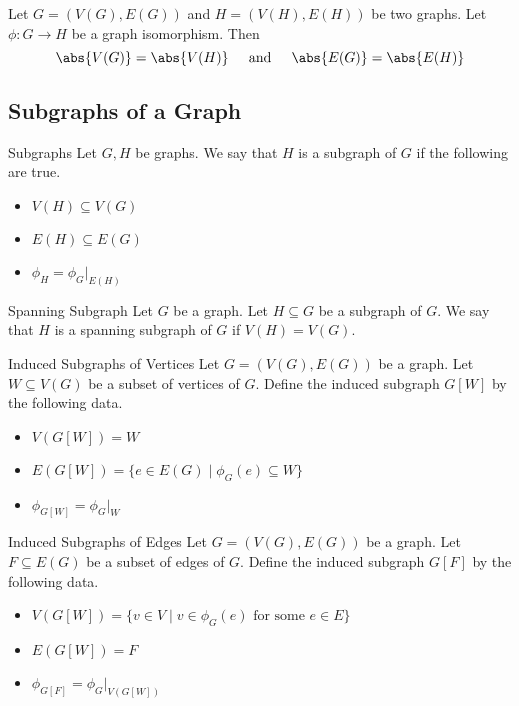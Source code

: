\documentclass[a4paper]{article}
\begin{document}
\begin{lmm}{}{} Let $G=(V(G),E(G))$ and $H=(V(H),E(H))$ be two graphs. Let $\phi:G\to H$ be a graph isomorphism. Then $$\abs{V(G)}=\abs{V(H)}\;\;\;\;\text{ and }\;\;\;\;\abs{E(G)}=\abs{E(H)}$$
\end{lmm}

\subsection{Subgraphs of a Graph}
\begin{defn}{Subgraphs}{} Let $G,H$ be graphs. We say that $H$ is a subgraph of $G$ if the following are true. 
\begin{itemize}
\item $V(H)\subseteq V(G)$
\item $E(H)\subseteq E(G)$
\item $\phi_H=\phi_G|_{E(H)}$
\end{itemize}
\end{defn}

\begin{defn}{Spanning Subgraph}{} Let $G$ be a graph. Let $H\subseteq G$ be a subgraph of $G$. We say that $H$ is a spanning subgraph of $G$ if $V(H)=V(G)$. 
\end{defn}

\begin{defn}{Induced Subgraphs of Vertices}{} Let $G=(V(G),E(G))$ be a graph. Let $W\subseteq V(G)$ be a subset of vertices of $G$. Define the induced subgraph $G[W]$ by the following data. 
\begin{itemize}
\item $V(G[W])=W$
\item $E(G[W])=\{e\in E(G)\;|\;\phi_G(e)\subseteq W\}$
\item $\phi_{G[W]}=\phi_G|_W$
\end{itemize}
\end{defn}

\begin{defn}{Induced Subgraphs of Edges}{} Let $G=(V(G),E(G))$ be a graph. Let $F\subseteq E(G)$ be a subset of edges of $G$. Define the induced subgraph $G[F]$ by the following data. 
\begin{itemize}
\item $V(G[W])=\{v\in V\;|\;v\in\phi_G(e)\text{ for some }e\in E\}$
\item $E(G[W])=F$
\item $\phi_{G[F]}=\phi_G|_{V(G[W])}$
\end{itemize}
\end{defn}
\end{document}
